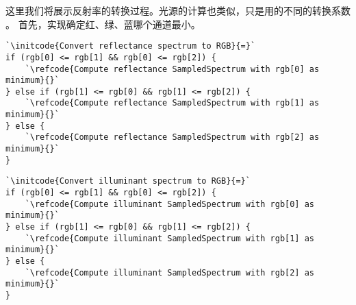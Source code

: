 这里我们将展示反射率的转换过程。光源的计算也类似，只是用的不同的转换系数
。
首先，实现确定红、绿、蓝哪个通道最小。
\begin{lstlisting}
`\initcode{Convert reflectance spectrum to RGB}{=}`
if (rgb[0] <= rgb[1] && rgb[0] <= rgb[2]) {
    `\refcode{Compute reflectance SampledSpectrum with rgb[0] as minimum}{}`
} else if (rgb[1] <= rgb[0] && rgb[1] <= rgb[2]) {
    `\refcode{Compute reflectance SampledSpectrum with rgb[1] as minimum}{}`
} else {
    `\refcode{Compute reflectance SampledSpectrum with rgb[2] as minimum}{}`
}
\end{lstlisting}
\begin{lstlisting}
`\initcode{Convert illuminant spectrum to RGB}{=}` 
if (rgb[0] <= rgb[1] && rgb[0] <= rgb[2]) {
    `\refcode{Compute illuminant SampledSpectrum with rgb[0] as minimum}{}`
} else if (rgb[1] <= rgb[0] && rgb[1] <= rgb[2]) {
    `\refcode{Compute illuminant SampledSpectrum with rgb[1] as minimum}{}`
} else {
    `\refcode{Compute illuminant SampledSpectrum with rgb[2] as minimum}{}`
}
\end{lstlisting}

